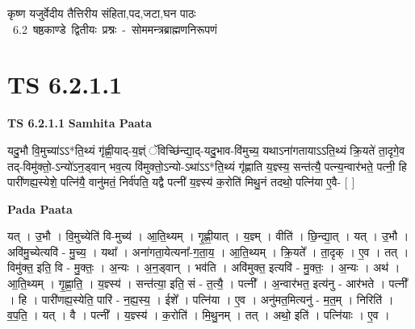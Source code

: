 \documentclass[17pt]{extarticle}
\begin{document}
\begin{titlepage}
    \begin{center}
 
\begin{sanskrit}
    { \Huge
    कृष्ण यजुर्वेदीय तैत्तिरीय संहिता,पद,जटा,घन पाठः 
    }
    \\
    \vspace{2.5cm}
    \mbox{ \Huge
    6.2       षष्ठकाण्डे द्वितीयः प्रश्नः - सोममन्त्रब्राह्मणनिरूपणं   }
\end{sanskrit}
\end{center}

\end{titlepage}
\tableofcontents
\pagebreak

\section*{ TS 6.2.1.1 }

\textbf{TS 6.2.1.1 } \newline
\textbf{Samhita Paata} \newline

यदु॒भौ वि॒मुच्या॑ऽऽ*ति॒थ्यं गृ॑ह्णी॒याद्-य॒ज्ञ्ं ॅविच्छि॑न्द्या॒द्-यदु॒भाव-वि॑मुच्य॒ यथाऽना॑गतायाऽऽति॒थ्यं क्रि॒यते॑ ता॒दृगे॒व तद्-विमु॑क्तो॒-ऽन्यो॑ऽन॒ड्वान् भव॒त्य वि॑मुक्तो॒ऽन्यो-ऽथा॑ऽऽ*ति॒थ्यं गृ॑ह्णाति य॒ज्ञ्स्य॒ सन्त॑त्यै॒ पत्न्य॒न्वार॑भते॒ पत्नी॒ हि पारी॑णह्य॒स्येशे॒ पत्नि॑यै॒ वानु॑मतं॒ निर्व॑पति॒ यद्वै पत्नी॑ य॒ज्ञ्स्य॑ क॒रोति॑ मिथु॒नं तदथो॒ पत्नि॑या ए॒वै- [  ] \newline

\textbf{Pada Paata} \newline

यत् । उ॒भौ । वि॒मुच्येति॑ वि-मुच्य॑ । आ॒ति॒थ्यम् । गृ॒ह्णी॒यात् । य॒ज्ञ्म् । वीति॑ । छि॒न्द्या॒त् । यत् । उ॒भौ । अवि॑मु॒च्येत्यवि॑ - मु॒च्य॒ । यथा᳚ । अना॑गता॒येत्यना᳚-ग॒ता॒य॒ । आ॒ति॒थ्यम् । क्रि॒यते᳚ । ता॒दृक् । ए॒व । तत् । विमु॑क्त॒ इति॒ वि - मु॒क्तः॒ । अ॒न्यः । अ॒न॒ड्वान् । भव॑ति । अवि॑मुक्त॒ इत्यवि॑ - मु॒क्तः॒ । अ॒न्यः । अथ॑ । आ॒ति॒थ्यम् । गृ॒ह्णा॒ति॒ । य॒ज्ञ्स्य॑ । सन्त॑त्या॒ इति॒ सं - त॒त्यै॒ । पत्नी᳚ । अ॒न्वार॑भत॒ इत्य॑नु - आर॑भते । पत्नी᳚ । हि । पारी॑णह्य॒स्येति॒ पारि॑ - न॒ह्य॒स्य॒ । ईशे᳚ । पत्नि॑या । ए॒व । अनु॑मत॒मित्यनु॑ - म॒त॒म् । निरिति॑ । व॒प॒ति॒ । यत् । वै । पत्नी᳚ । य॒ज्ञ्स्य॑ । क॒रोति॑ । मि॒थु॒नम् । तत् । अथो॒ इति॑ । पत्नि॑याः । ए॒व ।  \newline
\end{document}
